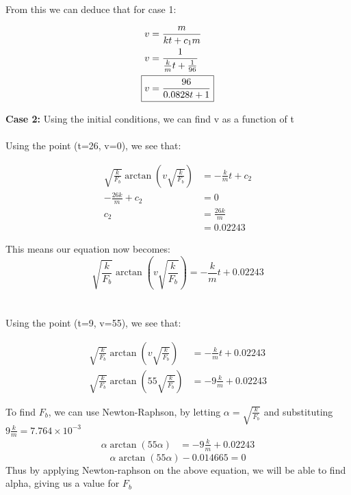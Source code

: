 From this we can deduce that for case 1:
\begin{center}
\begin{align*}
    v &= \frac{m}{kt+c_{1}m}
    \\ v &= \frac{1}{\frac{k}{m}t+\frac{1}{96}}
    \\ \Aboxed{v &= \frac{96}{0.0828t + 1}}
\end{align*}
\end{center}

\textbf{Case 2: } 
Using the initial conditions, we can find v as a function of t
\\ \\
Using the point (t=26, v=0), we see that:
\begin{center}
\begin{align*}
    \sqrt{\frac{k}{F_b}} \arctan{(v\sqrt{\frac{k}{F_b}})} &= -\frac{k}{m}t + c_2
    \\ -\frac{26k}{m} + c_2 &= 0
    \\ c_2 &= \frac{26k}{m} 
    \\ &= 0.02243
\end{align*}
\end{center}
This means our equation now becomes:
\begin{equation}
    \sqrt{\frac{k}{F_b}} \arctan{(v\sqrt{\frac{k}{F_b}})} = -\frac{k}{m}t + 0.02243
\end{equation}
\\ \\
Using the point (t=9, v=55), we see that:
\\
\begin{center}
\begin{align*}
    \sqrt{\frac{k}{F_b}} \arctan{(v\sqrt{\frac{k}{F_b}})} &= -\frac{k}{m}t + 0.02243
    \\ \sqrt{\frac{k}{F_b}} \arctan{(55\sqrt{\frac{k}{F_b}})} &= -9\frac{k}{m} + 0.02243
\end{align*}
\end{center}
To find $F_b$, we can use Newton-Raphson, by letting $\alpha=\sqrt{\frac{k}{F_b}}$ and substituting $9 \frac{k}{m} = 7.764\times{10^{-3}}$
\begin{align*}
    \alpha \arctan{(55\alpha)} &= -9 \frac{k}{m} + 0.02243
\end{align*}
\begin{equation}
    \alpha \arctan{(55\alpha)} - 0.014665 = 0
\end{equation}
Thus by applying Newton-raphson on the above equation, we will be able to find alpha, giving us a value for $F_b$


